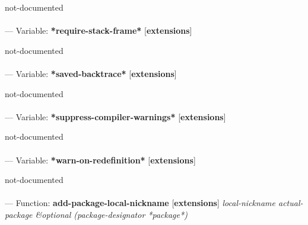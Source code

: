 \begin{adjustwidth}{5em}{5em}
not-documented
\end{adjustwidth}

\paragraph{}
\label{EXTENSIONS:*REQUIRE-STACK-FRAME*}
--- Variable: \textbf{*require-stack-frame*} [\textbf{extensions}] \textit{}

\begin{adjustwidth}{5em}{5em}
not-documented
\end{adjustwidth}

\paragraph{}
\label{EXTENSIONS:*SAVED-BACKTRACE*}
--- Variable: \textbf{*saved-backtrace*} [\textbf{extensions}] \textit{}

\begin{adjustwidth}{5em}{5em}
not-documented
\end{adjustwidth}

\paragraph{}
\label{EXTENSIONS:*SUPPRESS-COMPILER-WARNINGS*}
--- Variable: \textbf{*suppress-compiler-warnings*} [\textbf{extensions}] \textit{}

\begin{adjustwidth}{5em}{5em}
not-documented
\end{adjustwidth}

\paragraph{}
\label{EXTENSIONS:*WARN-ON-REDEFINITION*}
--- Variable: \textbf{*warn-on-redefinition*} [\textbf{extensions}] \textit{}

\begin{adjustwidth}{5em}{5em}
not-documented
\end{adjustwidth}

\paragraph{}
\label{EXTENSIONS:ADD-PACKAGE-LOCAL-NICKNAME}
--- Function: \textbf{add-package-local-nickname} [\textbf{extensions}] \textit{local-nickname actual-package \&optional (package-designator *package*)}

